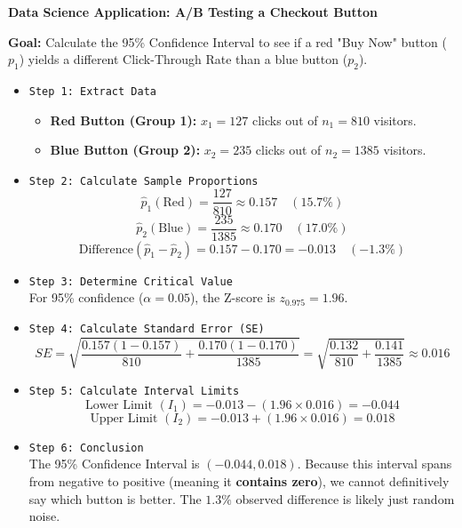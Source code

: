 \vspace{0.2cm}
\begin{example}{\textbf{Data Science Application: A/B Testing a Checkout Button}}

\textbf{Goal:} Calculate the 95\% Confidence Interval to see if a red "Buy Now" button ($p_1$) yields a different Click-Through Rate than a blue button ($p_2$).

\begin{itemize}
    \item \texttt{Step 1: Extract Data} 
    \begin{itemize}
        \item \textbf{Red Button (Group 1):} $x_1 = 127$ clicks out of $n_1 = 810$ visitors.
        \item \textbf{Blue Button (Group 2):} $x_2 = 235$ clicks out of $n_2 = 1385$ visitors.
    \end{itemize}
    
    \item \texttt{Step 2: Calculate Sample Proportions} 
    $$ \hat{p}_1 (\text{Red}) = \frac{127}{810} \approx 0.157 \quad (15.7\%) $$
    $$ \hat{p}_2 (\text{Blue}) = \frac{235}{1385} \approx 0.170 \quad (17.0\%) $$
    $$ \text{Difference} (\hat{p}_1 - \hat{p}_2) = 0.157 - 0.170 = -0.013 \quad (-1.3\%) $$

    \item \texttt{Step 3: Determine Critical Value} \\
    For 95\% confidence ($\alpha = 0.05$), the Z-score is $z_{0.975} = 1.96$.

    \item \texttt{Step 4: Calculate Standard Error (SE)} 
    $$ SE = \sqrt{\frac{0.157(1-0.157)}{810} + \frac{0.170(1-0.170)}{1385}} = \sqrt{\frac{0.132}{810} + \frac{0.141}{1385}} \approx 0.016 $$
 
    \item \texttt{Step 5: Calculate Interval Limits} 
    $$ \text{Lower Limit } (I_1) = -0.013 - (1.96 \times 0.016) = -0.044 $$
    $$ \text{Upper Limit } (I_2) = -0.013 + (1.96 \times 0.016) = 0.018 $$
    
    \item \texttt{Step 6: Conclusion} \\
    The 95\% Confidence Interval is $\boxed{(-0.044, 0.018)}$. Because this interval spans from negative to positive (meaning it \textbf{contains zero}), we cannot definitively say which button is better. The $1.3\%$ observed difference is likely just random noise.
\end{itemize}
\end{example}

